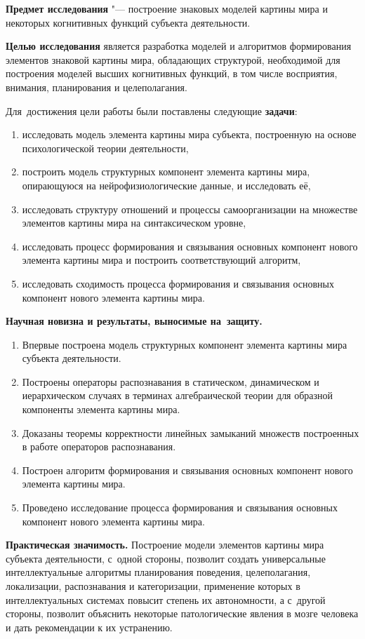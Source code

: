 \textbf{Предмет исследования} "--- построение знаковых моделей картины мира и некоторых когнитивных функций субъекта деятельности.

\textbf{Целью исследования} является разработка моделей и алгоритмов формирования элементов знаковой картины мира, обладающих структурой, необходимой для построения моделей высших когнитивных функций, в том числе восприятия, внимания, планирования и целеполагания.

Для~достижения цели работы были поставлены следующие \textbf{задачи}:
\begin{enumerate}
	\item исследовать модель элемента картины мира субъекта, построенную на основе психологической теории деятельности,
	\item построить модель структурных компонент элемента картины мира, опирающуюся на нейрофизиологические данные, и исследовать её,
	\item исследовать структуру отношений и процессы самоорганизации на множестве элементов картины мира на синтаксическом уровне,
	\item исследовать процесс формирования и связывания основных компонент нового элемента картины мира и построить соответствующий алгоритм,
	\item исследовать сходимость процесса формирования и связывания основных компонент нового элемента картины мира.
\end{enumerate}

\textbf{Научная новизна и результаты, выносимые на~защиту.}
\begin{enumerate}
	\renewcommand\labelenumi{\theenumi.}
	\item Впервые построена модель структурных компонент элемента картины мира субъекта деятельности.
	\item Построены операторы распознавания в статическом, динамическом и иерархическом случаях в терминах алгебраической теории для образной компоненты элемента картины мира.
	\item Доказаны теоремы корректности линейных замыканий множеств построенных в работе операторов распознавания.
	\item Построен алгоритм формирования и связывания основных компонент нового элемента картины мира.
	\item Проведено исследование процесса формирования и связывания основных компонент нового элемента картины мира.
\end{enumerate}

\textbf{Практическая значимость.} Построение модели элементов картины мира субъекта деятельности, с~одной стороны, позволит создать универсальные интеллектуальные алгоритмы планирования поведения, целеполагания, локализации, распознавания и категоризации, применение которых в интеллектуальных системах повысит степень их автономности, а с~другой стороны, позволит объяснить некоторые патологические явления в мозге человека и дать рекомендации к их устранению.

